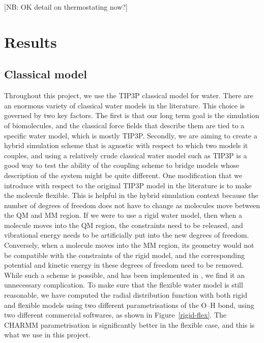 \documentclass[11pt]{revtex4}
\begin{document}
[NB: OK detail on thermostating now?]

\section{Results}

\subsection{Classical model}

Throughout this project, we use the TIP3P classical model for water. There are an enormous variety of classical water models in the literature. This choice is governed by two key factors. The first is that our long term goal is the simulation of biomolecules, and the classical force fields that describe them are tied to a specific water model, which is mostly TIP3P. Secondly, we are aiming to create a hybrid simulation scheme that is agnostic with respect to which two models it couples, and using a relatively crude classical water model such as TIP3P is a good way to test the ability of the coupling scheme to bridge models whose description of the system might be quite different. One modification that we introduce with respect to the original TIP3P model in the literature is to make the molecule flexible. This is helpful in the hybrid simulation context because the number of degrees of freedom does not have to change as molecules move between the QM and MM region. If we were to use a rigid water model, then when a molecule moves into the QM region, the constraints need to be released, and vibrational energy needs to be artificially put into the new degrees of freedom. Conversely, when a molecule moves into the MM region, its geometry would not be compatible with the constraints of the rigid model, and the corresponding potential and kinetic energy in these degrees of freedom need to be removed. While such a scheme is possible, and has been implemented in \cite{hodak_j_chem_phys_2008a,winfield_thesis_2009a}, we find it an unnecessary complication. To make sure that the flexible water model is still reasonable, we have computed the radial distribution function with both rigid and flexible models using two different parametrisations of the O--H bond, using two different commercial softwares, as shown in Figure~\ref{rigid-flex}. The CHARMM parametrisation is significantly better in the flexible case, and this is what we use in this project.
\end{document}
